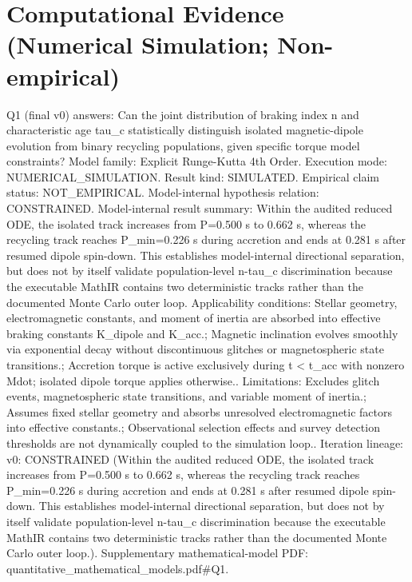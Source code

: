 \documentclass[conference]{IEEEtran}
\begin{document}
\section{Computational Evidence (Numerical Simulation; Non-empirical)}
Q1 (final v0) answers: Can the joint distribution of braking index n and characteristic age tau\_c statistically distinguish isolated magnetic-dipole evolution from binary recycling populations, given specific torque model constraints? Model family: Explicit Runge-Kutta 4th Order. Execution mode: NUMERICAL\_SIMULATION. Result kind: SIMULATED. Empirical claim status: NOT\_EMPIRICAL. Model-internal hypothesis relation: CONSTRAINED. Model-internal result summary: Within the audited reduced ODE, the isolated track increases from P=0.500 s to 0.662 s, whereas the recycling track reaches P\_min=0.226 s during accretion and ends at 0.281 s after resumed dipole spin-down. This establishes model-internal directional separation, but does not by itself validate population-level n-tau\_c discrimination because the executable MathIR contains two deterministic tracks rather than the documented Monte Carlo outer loop. Applicability conditions: Stellar geometry, electromagnetic constants, and moment of inertia are absorbed into effective braking constants K\_dipole and K\_acc.; Magnetic inclination evolves smoothly via exponential decay without discontinuous glitches or magnetospheric state transitions.; Accretion torque is active exclusively during t < t\_acc with nonzero Mdot; isolated dipole torque applies otherwise.. Limitations: Excludes glitch events, magnetospheric state transitions, and variable moment of inertia.; Assumes fixed stellar geometry and absorbs unresolved electromagnetic factors into effective constants.; Observational selection effects and survey detection thresholds are not dynamically coupled to the simulation loop.. Iteration lineage: v0: CONSTRAINED (Within the audited reduced ODE, the isolated track increases from P=0.500 s to 0.662 s, whereas the recycling track reaches P\_min=0.226 s during accretion and ends at 0.281 s after resumed dipole spin-down. This establishes model-internal directional separation, but does not by itself validate population-level n-tau\_c discrimination because the executable MathIR contains two deterministic tracks rather than the documented Monte Carlo outer loop.). Supplementary mathematical-model PDF: quantitative\_mathematical\_models.pdf\#Q1.
\end{document}
